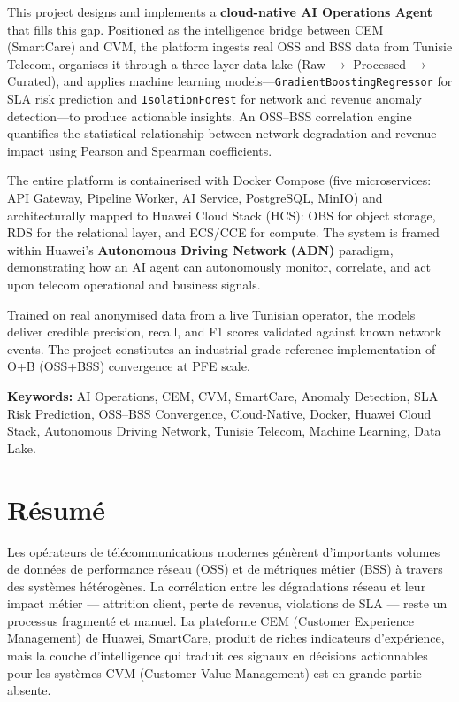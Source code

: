 This project designs and implements a \textbf{cloud-native AI Operations Agent} that fills this gap. Positioned as the intelligence bridge between CEM (SmartCare) and CVM, the platform ingests real OSS and BSS data from Tunisie Telecom, organises it through a three-layer data lake (Raw $\to$ Processed $\to$ Curated), and applies machine learning models---\texttt{GradientBoostingRegressor} for SLA risk prediction and \texttt{IsolationForest} for network and revenue anomaly detection---to produce actionable insights. An OSS--BSS correlation engine quantifies the statistical relationship between network degradation and revenue impact using Pearson and Spearman coefficients.

The entire platform is containerised with Docker Compose (five microservices: API Gateway, Pipeline Worker, AI Service, PostgreSQL, MinIO) and architecturally mapped to Huawei Cloud Stack (HCS): OBS for object storage, RDS for the relational layer, and ECS/CCE for compute. The system is framed within Huawei's \textbf{Autonomous Driving Network (ADN)} paradigm, demonstrating how an AI agent can autonomously monitor, correlate, and act upon telecom operational and business signals.

Trained on real anonymised data from a live Tunisian operator, the models deliver credible precision, recall, and F1 scores validated against known network events. The project constitutes an industrial-grade reference implementation of O+B (OSS+BSS) convergence at PFE scale.

\vspace{0.5cm}
\noindent\textbf{Keywords:} AI Operations, CEM, CVM, SmartCare, Anomaly Detection, SLA Risk Prediction, OSS--BSS Convergence, Cloud-Native, Docker, Huawei Cloud Stack, Autonomous Driving Network, Tunisie Telecom, Machine Learning, Data Lake.

\newpage

\chapter*{Résumé}

Les opérateurs de télécommunications modernes génèrent d'importants volumes de données de performance réseau (OSS) et de métriques métier (BSS) à travers des systèmes hétérogènes. La corrélation entre les dégradations réseau et leur impact métier --- attrition client, perte de revenus, violations de SLA --- reste un processus fragmenté et manuel. La plateforme CEM (Customer Experience Management) de Huawei, SmartCare, produit de riches indicateurs d'expérience, mais la couche d'intelligence qui traduit ces signaux en décisions actionnables pour les systèmes CVM (Customer Value Management) est en grande partie absente.

